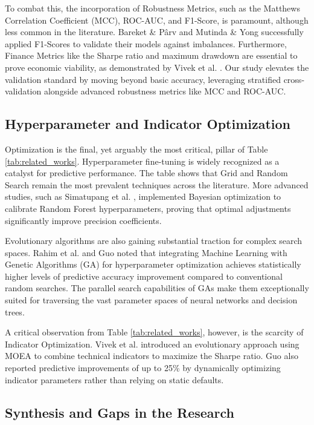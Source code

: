 \documentclass{ieeeaccess}
\begin{document}
To combat this, the incorporation of Robustness Metrics, such as the Matthews Correlation Coefficient (MCC), ROC-AUC, and F1-Score, is paramount, although less common in the literature. Bareket \& Pârv \cite{bareket2024adaptive} and Mutinda \& Yong \cite{mutinda2026hybrid} successfully applied  F1-Scores to validate their models against imbalances. Furthermore, Finance Metrics like the Sharpe ratio and maximum drawdown are essential to prove economic viability, as demonstrated by Vivek et al. \cite{vivek2025optimal}. Our study elevates the validation standard by moving beyond basic accuracy, leveraging stratified cross-validation alongside advanced robustness metrics like MCC and ROC-AUC.

\subsection{Hyperparameter and Indicator Optimization}

Optimization is the final, yet arguably the most critical, pillar of Table \ref{tab:related_works}. Hyperparameter fine-tuning is widely recognized as a catalyst for predictive performance. The table shows that Grid and Random Search remain the most prevalent techniques across the literature. More advanced studies, such as Simatupang et al. \cite{simatupang2026stock}, implemented Bayesian optimization to calibrate Random Forest hyperparameters, proving that optimal adjustments significantly improve precision coefficients.

Evolutionary algorithms are also gaining substantial traction for complex search spaces. Rahim et al. \cite{rahim2025technical} and Guo \cite{guo2025empirical} noted that integrating Machine Learning with Genetic Algorithms (GA) for hyperparameter optimization achieves statistically higher levels of predictive accuracy improvement compared to conventional random searches. The parallel search capabilities of GAs make them exceptionally suited for traversing the vast parameter spaces of neural networks and decision trees.

A critical observation from Table \ref{tab:related_works}, however, is the scarcity of Indicator Optimization. Vivek et al. \cite{vivek2025optimal} introduced an evolutionary approach using MOEA to combine technical indicators to maximize the Sharpe ratio. Guo \cite{guo2025empirical} also reported predictive improvements of up to 25\% by dynamically optimizing indicator parameters rather than relying on static defaults. 

\subsection{Synthesis and Gaps in the Research}
\end{document}
